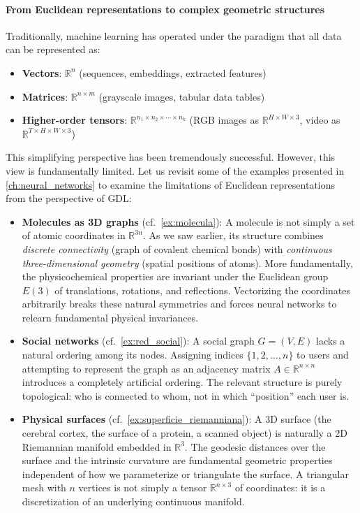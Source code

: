 \paragraph{From Euclidean representations to complex geometric structures}

Traditionally, machine learning has operated under the paradigm that all data can be represented as:

\begin{itemize}
    \item \textbf{Vectors}: $\mathbb{R}^n$ (sequences, embeddings, extracted features)
    \item \textbf{Matrices}: $\mathbb{R}^{n \times m}$ (grayscale images, tabular data tables)
    \item \textbf{Higher-order tensors}: $\mathbb{R}^{n_1 \times n_2 \times \cdots \times n_k}$ (RGB images as $\mathbb{R}^{H \times W \times 3}$, video as $\mathbb{R}^{T \times H \times W \times 3}$)
\end{itemize}

This simplifying perspective has been tremendously successful. However, this view is fundamentally limited. Let us revisit some of the examples presented in \autoref{ch:neural_networks} to examine the limitations of Euclidean representations from the perspective of \gls{GDL}:

\begin{itemize}
    \item \textbf{Molecules as 3D graphs} (cf.~\autoref{ex:molecula}): A molecule is not simply a set of atomic coordinates in $\mathbb{R}^{3n}$. As we saw earlier, its structure combines \textit{discrete connectivity} (graph of covalent chemical bonds) with \textit{continuous three-dimensional geometry} (spatial positions of atoms). More fundamentally, the physicochemical properties are invariant under the Euclidean group $E(3)$ of translations, rotations, and reflections. Vectorizing the coordinates arbitrarily breaks these natural symmetries and forces neural networks to relearn fundamental physical invariances.

    \item \textbf{Social networks} (cf.~\autoref{ex:red_social}): A social graph $G = (V, E)$ lacks a natural ordering among its nodes. Assigning indices $\{1, 2, \ldots, n\}$ to users and attempting to represent the graph as an adjacency matrix $A \in \mathbb{R}^{n \times n}$ introduces a completely artificial ordering. The relevant structure is purely topological: who is connected to whom, not in which ``position'' each user is.

    \item \textbf{Physical surfaces} (cf.~\autoref{ex:superficie_riemanniana}): A 3D surface (the cerebral cortex, the surface of a protein, a scanned object) is naturally a 2D Riemannian manifold embedded in $\mathbb{R}^3$. The geodesic distances over the surface and the intrinsic curvature are fundamental geometric properties independent of how we parameterize or triangulate the surface. A triangular mesh with $n$ vertices is not simply a tensor $\mathbb{R}^{n \times 3}$ of coordinates: it is a discretization of an underlying continuous manifold.
\end{itemize}

